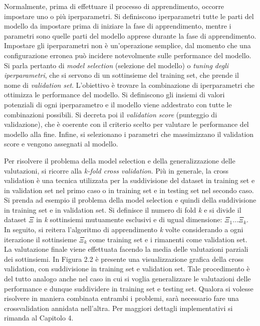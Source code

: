 \documentclass[11pt,  oneside, openany]{book}
\begin{document}
Normalmente, prima di effettuare il processo di apprendimento, occorre impostare uno o più iperparametri. Si definiscono iperparametri tutte le parti del modello da impostare prima di iniziare la fase di apprendimento, mentre i parametri sono quelle parti del modello apprese durante la fase di apprendimento. Impostare gli iperparametri non è un'operazione semplice, dal momento che una configurazione erronea può incidere notevolmente sulle performance del modello. Si parla pertanto di \textit{model selection} (selezione del modello) o \textit{tuning degli iperparametri}, che si servono di un sottinsieme del training set, che prende il nome di \textit{validation set}. L'obiettivo è trovare la combinazione di iperparametri che ottimizza le performance del modello. Si definiscono gli insiemi di valori potenziali di ogni iperparametro e il modello viene addestrato con tutte le combinazioni possibili. Si decreta poi il \textit{validation score} (punteggio di validazione), che è coerente con il criterio scelto per valutare le performance del modello alla fine. Infine, si selezionano i parametri che massimizzano il validation score e vengono assegnati al modello. 
 

Per risolvere il problema della model selection e della generalizzazione delle valutazioni, si ricorre alla \textit{k-fold cross validation}. Più in generale, la cross validation è una tecnica utilizzata per la suddivisione del dataset in training set e in validation set nel primo caso o in training set e in testing set nel secondo caso. Si prenda ad esempio il problema della model selection e quindi della suddivisione in training set e in validation set. Si definisce il numero di fold \textit{k} e si divide il dataset $\Xi$ in \textit{k} sottinsiemi mutuamente esclusivi e di ugual dimensione: $\Xi_1 ... \Xi_k$. In seguito, si reitera l'algoritmo di apprendimento \textit{k} volte considerando a ogni iterazione il sottinsieme $\Xi_k$ come training set e i rimanenti come validation set. La valutazione finale viene effettuata facendo la media delle valutazioni parziali dei sottinsiemi. In Figura 2.2 è presente una visualizzazione grafica della cross validation, con suddivisione in training set e validation set. Tale procedimento è del tutto analogo anche nel caso in cui si voglia generalizzare le valutazioni delle performance e dunque suddividere in training set e testing set. Qualora si volesse risolvere in maniera combinata entrambi i problemi, sarà necessario fare una crossvalidation annidata nell'altra. Per maggiori dettagli implementativi si rimanda al Capitolo 4. 
\end{document}
